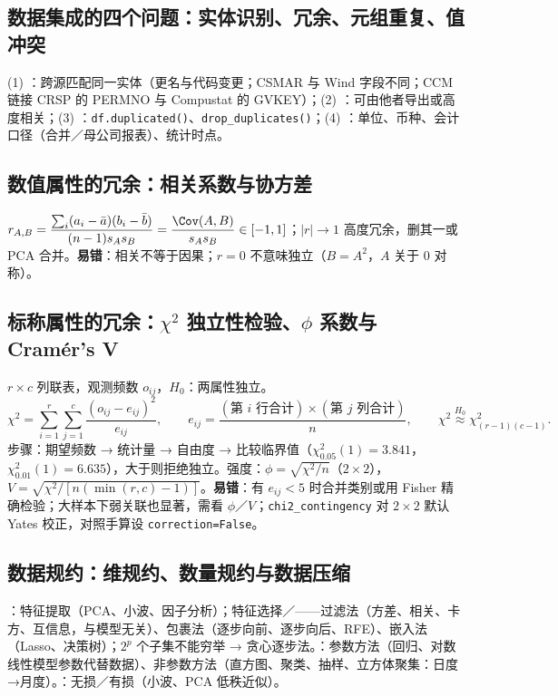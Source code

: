 \subsection{数据集成的四个问题：实体识别、冗余、元组重复、值冲突}
(1) ：跨源匹配同一实体（更名与代码变更；CSMAR 与 Wind 字段不同；CCM 链接 CRSP 的 PERMNO 与 Compustat 的 GVKEY）；(2) ：可由他者导出或高度相关；(3) ：\texttt{df.duplicated()}、\texttt{drop\_duplicates()}；(4) ：单位、币种、会计口径（合并／母公司报表）、统计时点。

\subsection{数值属性的冗余：相关系数与协方差}
$r_{A,B}=\dfrac{\sum_{i}(a_i-\bar a)(b_i-\bar b)}{(n-1)s_As_B}=\dfrac{\Cov(A,B)}{s_As_B}\in[-1,1]$；$|r|\to1$ 高度冗余，删其一或 PCA 合并。\textbf{易错}：相关不等于因果；$r=0$ 不意味独立（$B=A^2$，$A$ 关于 0 对称）。

\subsection{\texorpdfstring{标称属性的冗余：$\chi^2$ 独立性检验、$\phi$ 系数与 Cramér's V}{标称属性的冗余：卡方独立性检验、phi 系数与 Cramer's V}}
$r\times c$ 列联表，观测频数 $o_{ij}$，$H_0$：两属性独立。
\[\chi^2=\sum_{i=1}^r\sum_{j=1}^c\frac{(o_{ij}-e_{ij})^2}{e_{ij}},\qquad e_{ij}=\frac{(\text{第 }i\text{ 行合计})\times(\text{第 }j\text{ 列合计})}{n},\qquad \chi^2\overset{H_0}{\approx}\chi^2_{(r-1)(c-1)}.\]步骤：期望频数 → 统计量 → 自由度 → 比较临界值（$\chi^2_{0.05}(1)=3.841$，$\chi^2_{0.01}(1)=6.635$），大于则拒绝独立。强度：$\phi=\sqrt{\chi^2/n}$（$2\times2$），$V=\sqrt{\chi^2/[n(\min(r,c)-1)]}$。\textbf{易错}：有 $e_{ij}<5$ 时合并类别或用 Fisher 精确检验；大样本下弱关联也显著，需看 $\phi$／$V$；\texttt{chi2\_contingency} 对 $2\times2$ 默认 Yates 校正，对照手算设 \texttt{correction=False}。

\subsection{数据规约：维规约、数量规约与数据压缩}
：特征提取（PCA、小波、因子分析）；特征选择／——过滤法（方差、相关、卡方、互信息，与模型无关）、包裹法（逐步向前、逐步向后、RFE）、嵌入法（Lasso、决策树）；$2^p$ 个子集不能穷举 → 贪心逐步法。：参数方法（回归、对数线性模型参数代替数据）、非参数方法（直方图、聚类、抽样、立方体聚集：日度→月度）。：无损／有损（小波、PCA 低秩近似）。

